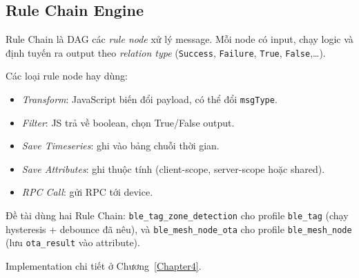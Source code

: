 \subsection{Rule Chain Engine}

Rule Chain là DAG các \textit{rule node} xử lý message. Mỗi node có input, chạy logic và định tuyến ra output theo \textit{relation type} (\texttt{Success}, \texttt{Failure}, \texttt{True}, \texttt{False},\ldots).

Các loại rule node hay dùng:

\begin{itemize}
    \item \textit{Transform}: JavaScript biến đổi payload, có thể đổi \texttt{msgType}.
    \item \textit{Filter}: JS trả về boolean, chọn True/False output.
    \item \textit{Save Timeseries}: ghi vào bảng chuỗi thời gian.
    \item \textit{Save Attributes}: ghi thuộc tính (client-scope, server-scope hoặc shared).
    \item \textit{RPC Call}: gửi RPC tới device.
\end{itemize}

Đề tài dùng hai Rule Chain: \texttt{ble\_tag\_zone\_detection} cho profile \texttt{ble\_tag} (chạy hysteresis + debounce đã nêu), và \texttt{ble\_mesh\_node\_ota} cho profile \texttt{ble\_mesh\_node} (lưu \texttt{ota\_result} vào attribute).

Implementation chi tiết ở Chương~\ref{Chapter4}.

